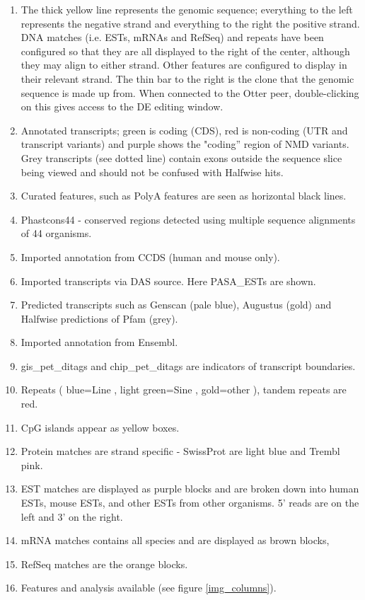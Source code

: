\documentclass[letterpaper]{article}
\begin{document}
\begin{enumerate}
\item  The thick yellow line represents the genomic sequence; everything to the left represents the negative strand and everything to the right the positive strand. DNA matches (i.e. ESTs, mRNAs and RefSeq) and repeats have been configured so that they are all displayed to the right of the center, although they may align to either strand. Other features are configured to display in their relevant strand. The thin bar to the right is the clone that the genomic sequence is made up from. When connected to the Otter peer, double-clicking on this gives access to the DE editing window.
\item  Annotated transcripts; green is coding (CDS), red is non-coding (UTR and transcript variants) and purple shows the "coding'' region of NMD variants. Grey transcripts (see dotted line) contain exons outside the sequence slice being viewed and should not be confused with Halfwise hits.
\item  Curated features, such as PolyA features are seen as horizontal black lines.
\item  Phastcons44 - conserved regions detected using multiple sequence alignments of 44 organisms.
\item  Imported annotation from CCDS (human and mouse only).
\item  Imported transcripts via DAS source. Here PASA\_ESTs are shown.
\item  Predicted transcripts such as Genscan (pale blue), Augustus (gold) and Halfwise predictions of Pfam (grey).
\item  Imported annotation from Ensembl.
\item  gis\_pet\_ditags and chip\_pet\_ditags are indicators of transcript boundaries.
\item Repeats ( blue=Line , light green=Sine , gold=other ), tandem repeats are red.
\item CpG islands appear as yellow boxes.
\item Protein matches are strand specific - SwissProt are light blue and Trembl pink.
\item EST matches are displayed as purple blocks and are broken down into human ESTs, mouse ESTs, and other ESTs from other organisms. 5' reads are on the left and 3' on the right.
\item mRNA matches contains all species and are displayed as brown blocks,
\item RefSeq matches are the orange blocks.
\item Features and analysis available (see figure \ref{img_columns}).
\end{enumerate}
\end{document}

